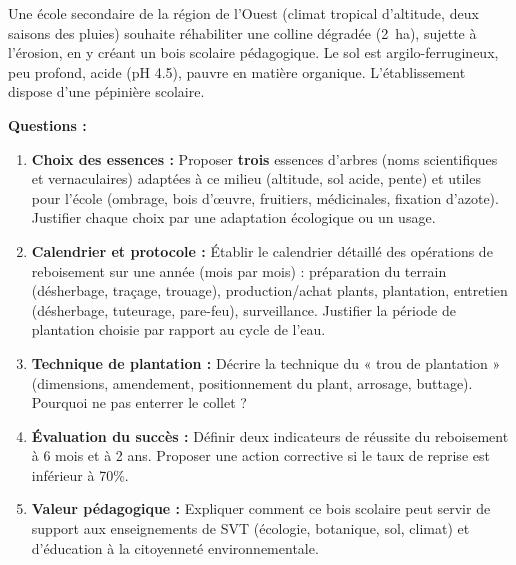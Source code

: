 \documentclass[11pt]{article}
\begin{document}
\begin{exercice}
Une école secondaire de la région de l'Ouest (climat tropical d'altitude, deux saisons des pluies) souhaite réhabiliter une colline dégradée (\SI{2}{\hectare}), sujette à l'érosion, en y créant un bois scolaire pédagogique. Le sol est argilo-ferrugineux, peu profond, acide (pH \num{4,5}), pauvre en matière organique. L'établissement dispose d'une pépinière scolaire.

\textbf{Questions :}
\begin{enumerate}
    \item \textbf{Choix des essences :} Proposer \textbf{trois} essences d'arbres (noms scientifiques et vernaculaires) adaptées à ce milieu (altitude, sol acide, pente) et utiles pour l'école (ombrage, bois d'œuvre, fruitiers, médicinales, fixation d'azote). Justifier chaque choix par une adaptation écologique ou un usage.
    \item \textbf{Calendrier et protocole :} Établir le calendrier détaillé des opérations de reboisement sur une année (mois par mois) : préparation du terrain (désherbage, traçage, trouage), production/achat plants, plantation, entretien (désherbage, tuteurage, pare-feu), surveillance. Justifier la période de plantation choisie par rapport au cycle de l'eau.
    \item \textbf{Technique de plantation :} Décrire la technique du « trou de plantation » (dimensions, amendement, positionnement du plant, arrosage, buttage). Pourquoi ne pas enterrer le collet ?
    \item \textbf{Évaluation du succès :} Définir deux indicateurs de réussite du reboisement à 6 mois et à 2 ans. Proposer une action corrective si le taux de reprise est inférieur à \num{70}\%.
    \item \textbf{Valeur pédagogique :} Expliquer comment ce bois scolaire peut servir de support aux enseignements de SVT (écologie, botanique, sol, climat) et d'éducation à la citoyenneté environnementale.
\end{enumerate}
\end{exercice}
\end{document}
